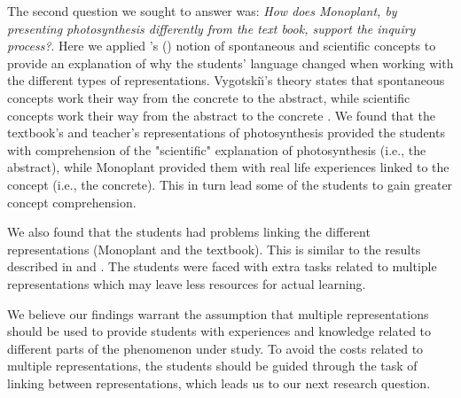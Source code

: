 The second question we sought to answer was: \emph{How does Monoplant, by presenting photosynthesis differently from the text book, support the inquiry process?}. Here we applied \citeauthor{vygotsky2012thought}'s (\citeyear{vygotsky2012thought}) notion of spontaneous and scientific concepts to provide an explanation of why the students' language changed when working with the different types of representations. Vygotski{\u\i}'s theory states that spontaneous concepts work their way from the concrete to the abstract, while scientific concepts work their way from the abstract to the concrete \citep{vygotsky2012thought}. We found that the textbook's and teacher's representations of photosynthesis provided the students with comprehension of the "scientific" explanation of photosynthesis (i.e., the abstract), while Monoplant provided them with real life experiences linked to the concept (i.e., the concrete). This in turn lead some of the students to gain greater concept comprehension. 

We also found that the students had problems linking the different representations (Monoplant and the textbook). This is similar to the results described in \citet{ainsworth1999functions} and \citet{van2006supporting}. The students were faced with extra tasks related to multiple representations which may leave less resources for actual learning. 

We believe our findings warrant the assumption that multiple representations should be used to provide students with experiences and knowledge related to different parts of the phenomenon under study. To avoid the costs related to multiple representations, the students should be guided through the task of linking between representations, which leads us to our next research question.





